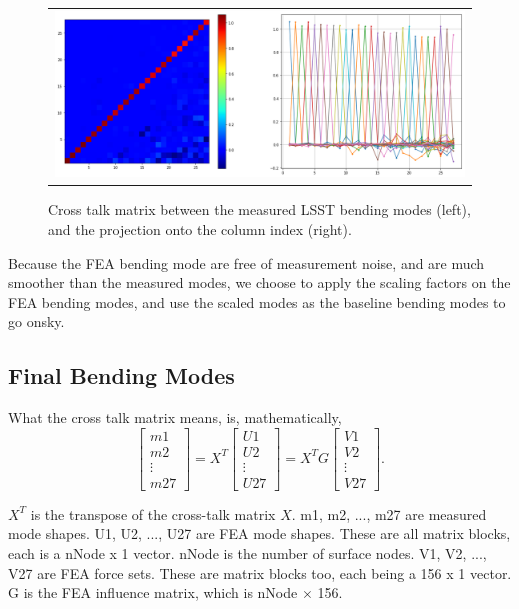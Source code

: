 \documentclass [twoside,openbib,12pt]{article}
\newcommand{\beq}{\begin{equation}}
\newcommand{\eeq}{\end{equation}}
\begin{document}
 \begin{figure}[bthp]
   \begin{center}
     \begin{tabular}{c}
\includegraphics[width=150mm]{figures/crossTalk.png}
  \end{tabular}
   \end{center}
   \caption
  { \label{fig:crossTalk}
Cross talk matrix between the measured LSST bending modes (left), and the
projection onto the column index (right).
 }
\end{figure}

Because the FEA bending mode are free of measurement noise, and are
much smoother than the measured modes, we
choose to apply the scaling factors on the FEA bending modes, and use
the scaled modes as the baseline bending modes to go onsky.

\subsection{Final Bending Modes}

What the cross talk matrix means, is, mathematically,
\beq
\left[ \begin{array}{c} m1  \\ m2 \\ \vdots \\ m27 \end{array} \right]
= X^T
\left[ \begin{array}{c} U1  \\ U2 \\ \vdots \\ U27 \end{array} \right]
= X^T G
\left[ \begin{array}{c} V1  \\ V2 \\ \vdots \\ V27 \end{array} \right].
\eeq

$X^T$ is the transpose of the cross-talk matrix $X$.
m1, m2, ..., m27 are measured mode shapes. U1, U2, ..., U27 are FEA mode shapes. These are all matrix blocks, each is a nNode x 1 vector. nNode is the number of surface nodes.
V1, V2, ..., V27 are FEA force sets. These are matrix blocks too, each being a 156 x 1 vector. G is the FEA influence matrix, which is nNode $\times$ 156.
\end{document}
